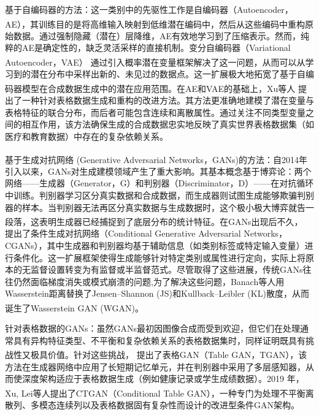 基于自编码器的方法：这一类别中的先驱性工作是自编码器（Autoencoder，AE）\textsuperscript{\cite{hinton2006reducing}}，其训练目的是将高维输入映射到低维潜在编码中，然后从这些编码中重构原始数据。通过强制隐藏（潜在）层降维，AE有效地学习到了压缩表示。然而，纯粹的AE是确定性的，缺乏灵活采样的直接机制。变分自编码器（Variational Autoencoder，VAE）\textsuperscript{\cite{kingma2013auto}} 通过引入概率潜在变量框架解决了这一问题，从而可以从学习到的潜在分布中采样出新的、未见过的数据点。这一扩展极大地拓宽了基于自编码器模型在合成数据生成中的潜在应用范围。在AE和VAE的基础上，Xu等人\textsuperscript{\cite{xu2019modeling}} 提出了一种针对表格数据生成和重构的改进方法。其方法更准确地建模了潜在变量与表格特征的联合分布，而后者可能包含连续和离散属性。通过关注不同类型变量之间的相互作用，该方法确保生成的合成数据忠实地反映了真实世界表格数据集（如医疗和教育数据）中存在的复杂依赖关系。

基于生成对抗网络 (Generative Adversarial Networks，GANs)\textsuperscript{\cite{goodfellow2014generative}}的方法：自2014年引入以来，GANs对生成建模领域产生了重大影响。其基本概念基于博弈论：两个网络——生成器（Generator，G）和判别器（Discriminator，D）——在对抗循环中训练。判别器学习区分真实数据和合成数据，而生成器则试图生成能够欺骗判别器的样本。当判别器无法再区分真实数据与生成数据时，这个极小极大博弈就告一段落，这表明生成器已经捕捉到了底层分布的统计特征。在GANs出现后不久，\textsuperscript{\cite{mirza2014conditional}} 提出了条件生成对抗网络（Conditional Generative Adversarial Networks，CGANs），其中生成器和判别器均基于辅助信息（如类别标签或特定输入变量）进行条件化。这一扩展框架使得生成能够针对特定类别或属性进行定向，实际上将原本的无监督设置转变为有监督或半监督范式。尽管取得了这些进展，传统GANs往往仍然面临梯度消失或模式崩溃的问题,为了解决这些问题，Banach等人用Wasserstein距离替换了Jensen–Shannon (JS)和Kullback–Leibler (KL)散度，从而诞生了Wasserstein GAN (WGAN)\textsuperscript{\cite{adler2018banach,arjovsky2017towards}}。

针对表格数据的GANs：虽然GANs最初因图像合成而受到欢迎，但它们在处理通常具有异构特征类型、不平衡和复杂依赖关系的表格数据集时，同样证明既具有挑战性又极具价值。针对这些挑战，\textsuperscript{\cite{xu2018synthesizing}} 提出了表格GAN（Table GAN，TGAN），该方法在生成器网络中应用了长短期记忆单元，并在判别器中采用了多层感知器，从而使深度架构适应于表格数据生成（例如健康记录或学生成绩数据）。2019 年，Xu, Lei等人\textsuperscript{\cite{xu2019modeling}}提出了CTGAN（Conditional Table GAN），一种专门为处理不平衡离散列、多模态连续列以及表格数据固有复杂性而设计的改进型条件GAN架构。

